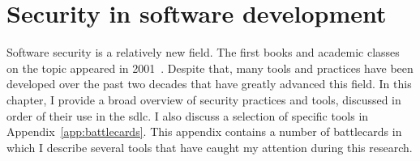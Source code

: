 \chapter{Security in software development}
\label{ch:related}

Software security is a relatively new field.
The first books and academic classes on the topic appeared in 2001~\cite{mcgraw2004software}.
Despite that, many tools and practices have been developed over the past two decades that have greatly advanced this field.
In this chapter, I provide a broad overview of security practices and tools, discussed in order of their use in the \gls{sdlc}.
I also discuss a selection of specific tools in Appendix~\ref{app:battlecards}.
This appendix contains a number of battlecards in which I describe several tools that have caught my attention during this research.







